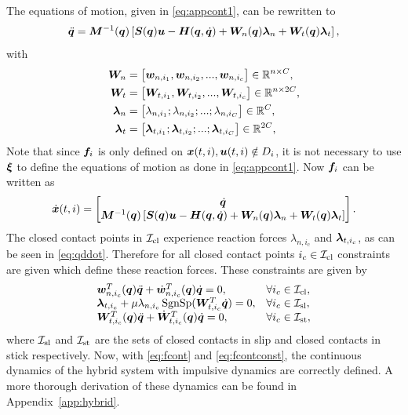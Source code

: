\documentclass[../DC2017114Bouma.tex]{subfiles}
\begin{document}
The equations of motion, given in \eqref{eq:appcont1}, can be rewritten to
\begin{align}
\ddot{{\boldsymbol{q}}} = {\boldsymbol{M}}^{-1}({\boldsymbol{q}})\left[ {\boldsymbol{S}}({\boldsymbol{q}}){\boldsymbol{u}} - {\boldsymbol{H}}({\boldsymbol{q}},\dot{{\boldsymbol{q}}}) + {\boldsymbol{W}}_{n}({\boldsymbol{q}})\boldsymbol{\lambda}_{n} + {\boldsymbol{W}}_{t}({\boldsymbol{q}})\boldsymbol{\lambda}_{t}\right],\label{eq:qddot}
\end{align}
with
\begin{align}
{\boldsymbol{W}}_n &= \begin{bmatrix}
{\boldsymbol{w}}_{n,i_1},{\boldsymbol{w}}_{n,i_2},...,{\boldsymbol{w}}_{n,i_c}
\end{bmatrix}\in\mathbb{R}^{n\times C},\\
{\boldsymbol{W}}_t &= \begin{bmatrix}
{\boldsymbol{W}}_{t,i_1},{\boldsymbol{W}}_{t,i_2},...,{\boldsymbol{W}}_{t,i_c} 
\end{bmatrix}\in\mathbb{R}^{n\times 2C},\\
\boldsymbol{\lambda}_n &= \begin{bmatrix}
\lambda_{n,i_1};\lambda_{n,i_2};...;\lambda_{n,i_C} 
\end{bmatrix}\in\mathbb{R}^{C},\\
\boldsymbol{\lambda}_t &= \begin{bmatrix}
\boldsymbol{\lambda}_{t,i_1};\boldsymbol{\lambda}_{t,i_2};...;\boldsymbol{\lambda}_{t,i_C} 
\end{bmatrix}\in\mathbb{R}^{2C},
\end{align}
Note that since ${\boldsymbol{f}}_i$ is only defined on ${\boldsymbol{x}}(t,i),{\boldsymbol{u}}(t,i)\notin D_i$, it is not necessary to use $\boldsymbol{\xi}$ to define the equations of motion as done in \eqref{eq:appcont1}. Now ${\boldsymbol{f}}_i$ can be written as
\begin{align}
\dot{{\boldsymbol{x}}}(t,i) =\begin{bmatrix}
\dot{{\boldsymbol{q}}}\\ {\boldsymbol{M}}^{-1}({\boldsymbol{q}})\left[ {\boldsymbol{S}}({\boldsymbol{q}}){\boldsymbol{u}} - {\boldsymbol{H}}({\boldsymbol{q}},\dot{{\boldsymbol{q}}}) + {\boldsymbol{W}}_{n}({\boldsymbol{q}})\boldsymbol{\lambda}_{n} + {\boldsymbol{W}}_{t}({\boldsymbol{q}})\boldsymbol{\lambda}_{t}\right]
\end{bmatrix}.\label{eq:fcont}
\end{align}
The closed contact points in $\mathcal{I}_{\text{cl}}$ experience reaction forces $\lambda_{n,i_c}$ and $\boldsymbol{\lambda}_{t,i_c}$, as can be seen in \eqref{eq:qddot}. Therefore for all closed contact points $i_c\in\mathcal{I}_{\text{cl}}$ constraints are given which define these reaction forces. These constraints are given by
\begin{equation}
\begin{array}{ll}
{\boldsymbol{w}}^T_{n,i_c}({\boldsymbol{q}})\ddot{{\boldsymbol{q}}} + \dot{{\boldsymbol{w}}}^T_{n,i_c}({\boldsymbol{q}})\dot{{\boldsymbol{q}}} = 0, & \forall i_c\in\mathcal{I}_{\text{cl}},\\
\boldsymbol{\lambda}_{t,i_c} + \mu\lambda_{n,i_c}\operatorname{\text{SgnSp}}({\boldsymbol{W}}_{t,i_c}^T\dot{{\boldsymbol{q}}}) = 0, & \forall i_c\in\mathcal{I}_{\text{sl}},\\
{\boldsymbol{W}}^T_{t,i_c}({\boldsymbol{q}})\ddot{{\boldsymbol{q}}} + \dot{{\boldsymbol{W}}}^T_{t,i_c}({\boldsymbol{q}})\dot{{\boldsymbol{q}}} = 0, & \forall i_c\in\mathcal{I}_{\text{st}},
\end{array}\label{eq:fcontconst}
\end{equation}
where $\mathcal{I}_{\text{sl}}$ and $\mathcal{I}_{\text{st}}$ are the sets of closed contacts in slip and closed contacts in stick respectively. Now, with \eqref{eq:fcont} and \eqref{eq:fcontconst}, the continuous dynamics of the hybrid system with impulsive dynamics are correctly defined. A more thorough derivation of these dynamics can be found in Appendix~\ref{app:hybrid}.
\end{document}
